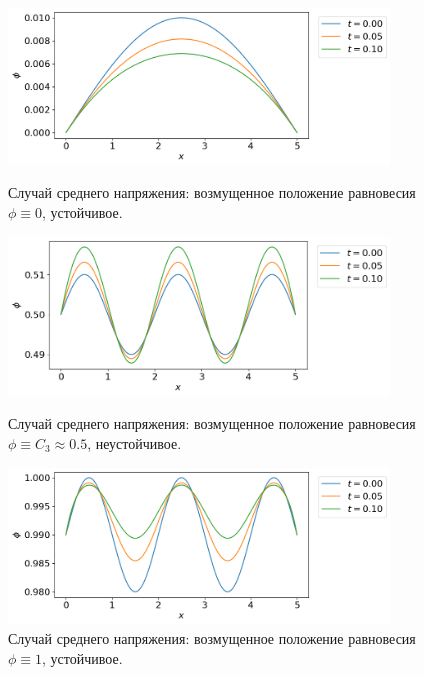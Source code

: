 \begin{figure}[!tp]
    \centering
    \includegraphics[width=0.9\textwidth]{figures/equilibrium_2_0.png}
    \vspace{-0.3cm}
    \caption{Случай среднего напряжения: возмущенное положение равновесия $\phi \equiv 0$, устойчивое.}
    \label{fig:equilibrium_2_0}
    \vspace{0.5cm}

    \includegraphics[width=0.9\textwidth]{figures/equilibrium_2_05.png}
    \vspace{-0.3cm}
    \caption{Случай среднего напряжения: возмущенное положение равновесия $\phi \equiv C_3 \approx 0.5$, неустойчивое.}
    \label{fig:equilibrium_2_05}
    \vspace{0.5cm}
    
    \includegraphics[width=0.9\textwidth]{figures/equilibrium_2_1.png}
    \vspace{-0.3cm}
    \caption{Случай среднего напряжения: возмущенное положение равновесия $\phi \equiv 1$, устойчивое.}
    \label{fig:equilibrium_2_1}
\end{figure}

